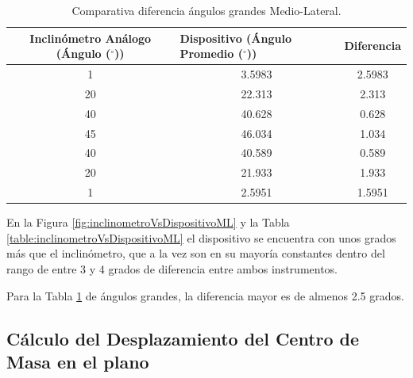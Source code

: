 \documentclass[12pt,a4paper]{article}
\newcommand{\grad}{$^{\circ}$}
\begin{document}
\begin{table}[H]
	\centering
	\caption{Comparativa diferencia ángulos grandes Medio-Lateral.}
	\begin{tabular}{|c|c|c|}
		\hline
		\textbf{Inclinómetro Análogo (Ángulo (\grad))} & \multicolumn{1}{l|}{\textbf{Dispositivo (Ángulo Promedio (\grad))}} & Diferencia				 \\ \hline
		1                                      & 3.5983                                                      & 2.5983                     \\ \hline
		20                                     & 22.313                                                      & 2.313                     \\ \hline
		40                                     & 40.628                                                      & 0.628                    \\ \hline
		45                                     & 46.034                                                      & 1.034                      \\ \hline
		40                                     & 40.589                                                      & 0.589                     \\ \hline
		20                                     & 21.933                                                      & 1.933                      \\ \hline
		1                                      & 2.5951                                                      & 1.5951                    \\ \hline
	\end{tabular}	
	\label{table:inclinometroVsDispositivoMLD}
\end{table}

En la Figura \ref{fig:inclinometroVsDispositivoML} y la Tabla \ref{table:inclinometroVsDispositivoML} el dispositivo se encuentra con unos grados más que el inclinómetro, que a la vez son en su mayoría constantes dentro del rango de entre 3 y 4 grados de diferencia entre ambos instrumentos.

Para la Tabla \ref{table:inclinometroVsDispositivoMLD} de ángulos grandes, la diferencia mayor es de almenos 2.5 grados.
 
\newpage
\subsection{Cálculo del Desplazamiento del Centro de Masa en el plano}
\end{document}
